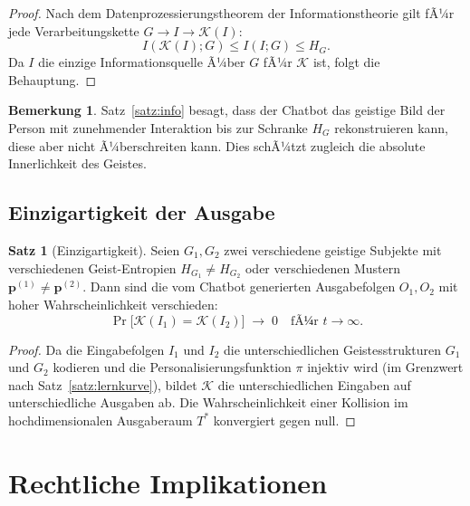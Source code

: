 ﻿\documentclass[a4paper,12pt]{article}
\theoremstyle{definition}
\newtheorem{satz}{Satz}
\newtheorem{bemerkung}{Bemerkung}
\begin{document}
\begin{proof}
Nach dem Datenprozessierungstheorem der Informationstheorie \cite{cover2006elements}
gilt fÃ¼r jede Verarbeitungskette $G \to I \to \mathcal{K}(I)$:
\[
    I(\mathcal{K}(I); G) \leq I(I; G) \leq H_G.
\]
Da $I$ die einzige Informationsquelle Ã¼ber $G$ fÃ¼r $\mathcal{K}$ ist, folgt die Behauptung.
\end{proof}

\begin{bemerkung}
Satz~\ref{satz:info} besagt, dass der Chatbot das geistige Bild der Person mit zunehmender
Interaktion bis zur Schranke $H_G$ rekonstruieren kann, diese aber nicht Ã¼berschreiten kann.
Dies schÃ¼tzt zugleich die absolute Innerlichkeit des Geistes.
\end{bemerkung}

\subsection{Einzigartigkeit der Ausgabe}

\begin{satz}[Einzigartigkeit]
\label{satz:einzig}
Seien $G_1, G_2$ zwei verschiedene geistige Subjekte mit verschiedenen Geist-Entropien
$H_{G_1} \neq H_{G_2}$ oder verschiedenen Mustern $\mathbf{p}^{(1)} \neq \mathbf{p}^{(2)}$.
Dann sind die vom Chatbot generierten Ausgabefolgen $O_1, O_2$ mit hoher Wahrscheinlichkeit
verschieden:
\[
    \Pr\bigl[\mathcal{K}(I_1) = \mathcal{K}(I_2)\bigr] \;\to\; 0 \quad \text{fÃ¼r } t \to \infty.
\]
\end{satz}

\begin{proof}
Da die Eingabefolgen $I_1$ und $I_2$ die unterschiedlichen Geistesstrukturen $G_1$ und $G_2$
kodieren und die Personalisierungsfunktion $\pi$ injektiv wird (im Grenzwert nach
Satz~\ref{satz:lernkurve}), bildet $\mathcal{K}$ die unterschiedlichen Eingaben auf
unterschiedliche Ausgaben ab. Die Wahrscheinlichkeit einer Kollision im hochdimensionalen
Ausgaberaum $T^*$ konvergiert gegen null.
\end{proof}

\section{Rechtliche Implikationen}
\label{sec:recht}
\end{document}
